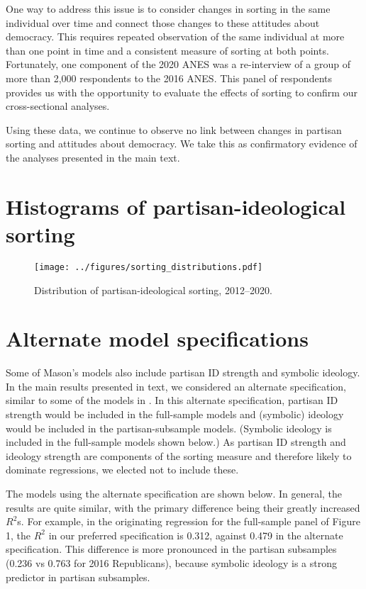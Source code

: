 \documentclass[10pt,landscape]{article}
\begin{document}
One way to address this issue is to consider changes in sorting in the same individual over time and connect those changes to these attitudes about democracy. 
This requires repeated observation of the same individual at more than one point in time and a consistent measure of sorting at both points.
Fortunately, one component of the 2020 ANES was a re-interview of a group of more than 2,000 respondents to the 2016 ANES.
This panel of respondents provides us with the opportunity to evaluate the effects of sorting to confirm our cross-sectional analyses.

Using these data, we continue to observe no link between changes in partisan sorting and attitudes about democracy. 
We take this as confirmatory evidence of the analyses presented in the main text.




\clearpage
\section{Histograms of partisan-ideological sorting}

\begin{figure}[h]
    \centering
    \texttt{[image: ../figures/sorting\_distributions.pdf]}
    \caption{Distribution of partisan-ideological sorting, 2012--2020.}
    \label{fig:sorting_distribution}
\end{figure}

\clearpage
\section{Alternate model specifications}

Some of Mason’s models also include partisan ID strength and symbolic ideology. 
In the main results presented in text, we considered an alternate specification, similar to some of the models in \textcite{mason_uncivil_2018}.
In this alternate specification, partisan ID strength would be included in the full-sample models and (symbolic) ideology would be included in the partisan-subsample models.
(Symbolic ideology is included in the full-sample models shown below.)
As partisan ID strength and ideology strength are components of the sorting measure and therefore likely to dominate regressions, we elected not to include these. 

The models using the alternate specification are shown below.
In general, the results are quite similar, with the primary difference being their greatly increased \(R^2\)s.
For example, in the originating regression for the full-sample panel of Figure 1, the \(R^2\) in our preferred specification is 0.312, against 0.479 in the alternate specification.
This difference is more pronounced in the partisan subsamples (0.236 vs 0.763 for 2016 Republicans), because symbolic ideology is a strong predictor in partisan subsamples.
\end{document}
